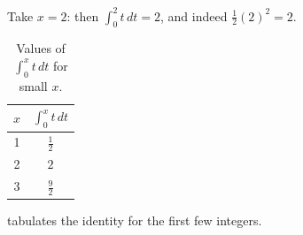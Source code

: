 \documentclass{thesis}
\begin{document}
\begin{example}
Take $x = 2$: then $\int_0^2 t\,dt = 2$, and indeed $\tfrac{1}{2}(2)^2 = 2$.
\end{example}

%
\begin{table}[htbp]
	\centering
	\caption{Values of $\int_0^x t\,dt$ for small $x$.}
	\label{tab:values}
	\begin{tabular}{cc}
		\toprule
		$x$ & $\int_0^x t\,dt$ \\
		\midrule
		1 & $\tfrac{1}{2}$ \\
		2 & $2$ \\
		3 & $\tfrac{9}{2}$ \\
		\bottomrule
	\end{tabular}
\end{table}

 tabulates the identity for the first few integers.

\makereferences
\end{document}
